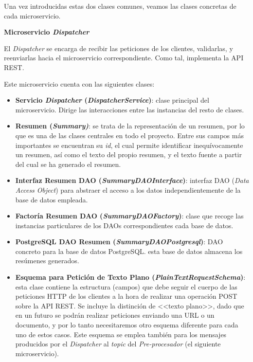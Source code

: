 Una vez introducidas estas dos clases comunes, veamos las clases concretas de cada microservicio.

\newpage

\noindent
\textbf{\large Microservicio \emph{Dispatcher}}

El \emph{Dispatcher} se encarga de recibir las peticiones de los clientes, validarlas, y reenviarlas hacia el microservicio correspondiente. Como tal, implementa la API REST.

Este microservicio cuenta con las siguientes clases:

\vspace{-0.2cm}
\begin{itemize} [\textbullet]
	\item \textbf{Servicio \emph{Dispatcher} (\emph{DispatcherService})}: clase principal del microservicio. Dirige las interacciones entre las instancias del resto de clases.
	\item \textbf{Resumen (\emph{Summary)}}: se trata de la representación de un resumen, por lo que es una de las clases centrales en todo el proyecto. Entre sus campos más importantes se encuentran su \emph{id}, el cual permite identificar inequívocamente un resumen, así como el texto del propio resumen, y el texto fuente a partir del cual se ha generado el resumen.
	
	\item \textbf{Interfaz Resumen DAO (\emph{SummaryDAOInterface})}: interfaz DAO (\emph{Data Access Object}) para abstraer el acceso a los datos independientemente de la base de datos empleada.
	
	\item \textbf{Factoría Resumen DAO (\emph{SummaryDAOFactory})}: clase que recoge las instancias particulares de los DAOs correspondientes cada base de datos.
	
	\item \textbf{PostgreSQL DAO Resumen (\emph{SummaryDAOPostgresql})}: DAO concreto para la base de datos PostgreSQL. esta base de datos almacena los resúmenes generados.

	\item \textbf{Esquema para Petición de Texto Plano (\emph{PlainTextRequestSchema})}: esta clase contiene la estructura (campos) que debe seguir el cuerpo de las peticiones HTTP de los clientes a la hora de realizar una operación POST sobre la API REST. Se incluye la distinción de <<texto plano>>, dado que en un futuro se podrán realizar peticiones enviando una URL o un documento, y por lo tanto necesitaremos otro esquema diferente para cada uno de estos casos. Este esquema se emplea también para los mensajes producidos por el \emph{Dispatcher} al \emph{topic} del \emph{Pre-procesador} (el siguiente microservicio).
	

\end{itemize}

